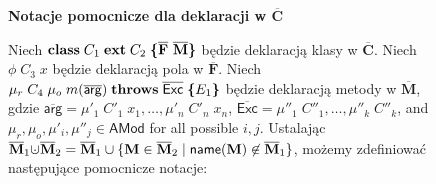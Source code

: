 \documentclass[]{pracamgr}
\renewcommand \| {\hspace{0.75em} | \hspace{0.75em} }
\renewcommand \[ {[\![}
\renewcommand \] {]\!]}
\theoremstyle{definition}
\newcommand{\mmod}{\mu\xspace}
\newcommand{\fmodifier}{\phi\xspace}
\newcommand{\args}{\overline{\mathsf{arg}}\xspace}
\newcommand{\Exc}{\overline{\mathsf{Exc}}\xspace}
\newcommand{\jclass}{\mathbf{class}\xspace}
\newcommand{\jext}{\mathbf{ext}\xspace}
\newcommand{\throws}{\mathbf{throws}\xspace}
\newcommand{\Lannot}{\mathsf{AMod}\xspace}
\newcommand{\dotcup}{\hbox{$\cup\hspace{-1.08ex}\cdot\hspace{0.5ex}$}\xspace}
\newcommand{\name}{\mathsf{name}\xspace}
\begin{document}
\begin{figure}[h]
\begin{center}
  {\bf Notacje pomocnicze dla deklaracji w $ \overline{\mathbf{C}} $}\\[2ex]
\end{center}
\begin{minipage}{0.95\textwidth}
Niech \(\jclass \;C_1\; \jext\; C_2\; \boldsymbol\{ \overline{\mathbf{F}}~ \overline{\mathbf{M}} \boldsymbol\}\)
będzie deklaracją klasy w \(\overline{\mathbf{C}}\). 
Niech \(\fmodifier\;C_3\; x\) będzie deklaracją pola w \(\overline{\mathbf{F}}\).
Niech \(\mmod_r\; C_4\; \mmod_o\; m(\args)\; \throws\; \Exc\; \boldsymbol\{E_1\boldsymbol\}\)
będzie deklaracją metody w \(\overline{\mathbf{M}}\),
gdzie $\args = \mmod'_1\; C'_1\;x_1,\ldots,\mmod'_n\; C'_n\;x_n$,
$\Exc = \mmod''_1\; C''_1,\ldots, \mmod''_k\; C''_k$, and
$\mmod_r,\mmod_o,\mmod'_i, \mmod''_j\in\Lannot$ for all possible $i,j$.
Ustalając
\(\overline{\mathbf{M}}_1 \dotcup \overline{\mathbf{M}}_2 = 
 \overline{\mathbf{M}}_1 \cup \{ \mathbf{M} \in \overline{\mathbf{M}}_2\;|\; \name(\mathbf{M}) \not \in \overline{\mathbf{M}}_1 \}\), 
możemy zdefiniować następujące pomocnicze notacje:
\end{minipage}

\medskip


\end{figure}
\end{document}
